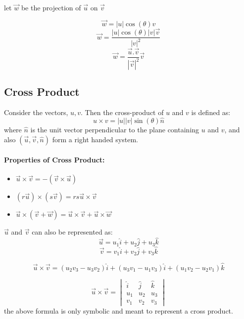 \documentclass{article}
\begin{document}
let $\vec{w}$ be the projection of $\vec{u}$ on $\vec{v}$

$$\vec{w} = |u| \cos(\theta) \hat{v}$$
$$\vec{w} = \frac{|u| \cos(\theta)|v|\vec{v} }{|v|^2}$$
$$\vec{w} = \frac{\vec{u}.\vec{v}}{|\vec{v}|^2} \vec{v}$$

\subsection*{Cross Product}
Consider the vectors, $u,v$. Then the cross-product of $u$ and $v$ is defined as:
$$u \times v = |u||v|\sin(\theta) \hat{n}$$
where $\hat{n}$ is the unit vector perpendicular to the plane containing $u$ and $v$, and also $(\vec{u}, \vec{v}, \hat{n})$ form a right handed system.

\paragraph*{Properties of Cross Product: }
\begin{itemize}
    \item $\vec{u} \times \vec{v} = - (\vec{v} \times \vec{u})$
    \item $(r\vec{u}) \times (s \vec{v}) = rs \vec{u} \times \vec{v}$
    \item $ \vec{u} \times (\vec{v} + \vec{w}) = \vec{u} \times \vec{v} + \vec{u} \times \vec{w}$
\end{itemize}

$\vec{u}$ and $\vec{v}$ can also be represented as: 
$$ \vec{u} = u_1 \hat{i} + u_2 \hat{j} + u_3 \hat{k}$$
$$ \vec{v} = v_1 \hat{i} + v_2 \hat{j} + v_3 \hat{k}$$

$$\vec{u} \times \vec{v} = (u_2 v_3 - u_3 v_2)\hat{i} + (u_3 v_1 - u_1 v_3)\hat{i} + (u_1 v_2 - u_2 v_1)\hat{k}$$

$$\vec{u} \times \vec{v} = \begin{vmatrix}
    \hat{i} & \hat{j} & \hat{k} \\
    u_1 & u_2 & u_3\\
    v_1 & v_2 & v_3
\end{vmatrix}
$$
the above formula is only symbolic and meant to represent a cross product.
\end{document}
